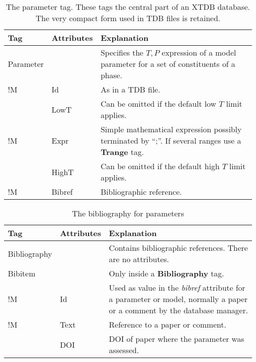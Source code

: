 \documentclass[10pt]{article}
\begin{document}

\begin{table}[!h]
  \caption{The parameter tag.  These tags the central part of an XTDB
    database.  The very compact form used in TDB files is
    retained.}\label{sc:partag}

\begin{tabular}{|p{} p{} p{}|}\hline
  Tag & Attributes & Explanation\\\hline

  Parameter & & Specifies the $T, P$ expression of a model parameter for a set of constituents of a phase.\\
  !M      & Id & As in a TDB file. \\

      & LowT & Can be omitted if the default low $T$ limit applies.\\
!M      & Expr & Simple mathematical expression possibly terminated by ``;''.
      If several ranges use a {\bf Trange} tag.  \\
      & HighT & Can be omitted if the default high $T$ limit applies.\\
!M      & Bibref & Bibliographic reference.\\\hline
\end{tabular}
\end{table}


\begin{table}[!h]
  \caption{The bibliography for parameters}
\begin{tabular}{|p{} p{} p{}|}\hline
  Tag & Attributes &  Explanation\\\hline

  Bibliography & & Contains bibliographic references.
                   There are no attributes.\\\hline

  Bibitem & & Only inside a {\bf Bibliography} tag.\\
!M      & Id &   Used as value in the {\em bibref} attribute for a parameter
            or model, normally a paper or a comment by the database manager.\\
!M      & Text & Reference to a paper or comment.\\
       & DOI & DOI of paper where the parameter was assessed.\\\hline
\end{tabular}
\end{table}
\end{document}
